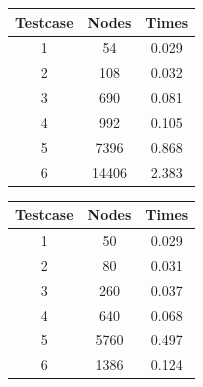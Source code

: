 \documentclass[a4paper,9pt]{article}
\begin{document}
\begin{figure}[H]
	\centering
\begin{minipage}{0.4\textwidth}
	\begin{tabular}{| c | c | c |}
		\hline
		Testcase & Nodes & Times \\
		\hline
		\hline
		1 & 54 & 0.029\\
		2 & 108 & 0.032\\
		3 & 690 & 0.081\\
		4 & 992 & 0.105\\
		5 & 7396 & 0.868\\
		6 & 14406 & 2.383\\
		\hline
	\end{tabular}
	\end{minipage}
\begin{minipage}{0.4\textwidth}
	\begin{tabular}{| c | c | c |}
		\hline
		Testcase & Nodes & Times \\
		\hline
		\hline
		1 & 50 & 0.029\\
		2 & 80 & 0.031\\
		3 & 260 & 0.037\\
		4 & 640 & 0.068\\
		5 & 5760 & 0.497\\
		6 & 1386 & 0.124\\
		\hline
	\end{tabular}
	\end{minipage}
\end{figure}
\end{document}
